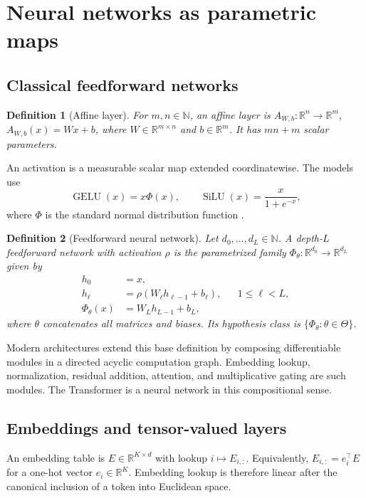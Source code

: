 \documentclass[11pt]{article}
\newtheorem{definition}{Definition}[section]
\newcommand{\N}{\mathbb N}
\newcommand{\R}{\mathbb R}
\newcommand{\1}{\mathbf 1}
\begin{document}
\section{Neural networks as parametric maps}
\label{sec:networks}

\subsection{Classical feedforward networks}

\begin{definition}[Affine layer]
For $m,n\in\N$, an affine layer is
$A_{W,b}:\R^n\to\R^m$, $A_{W,b}(x)=Wx+b$, where
$W\in\R^{m\times n}$ and $b\in\R^m$. It has $mn+m$ scalar parameters.
\end{definition}

An activation is a measurable scalar map extended coordinatewise. The models
use
\[
 \operatorname{GELU}(x)=x\Phi(x),
 \qquad
 \operatorname{SiLU}(x)=\frac{x}{1+e^{-x}},
\]
where $\Phi$ is the standard normal distribution function
\cite{hendrycks-2016-gelu,elfwing-2018-sigmoid}.

\begin{definition}[Feedforward neural network]
Let $d_0,\ldots,d_L\in\N$. A depth-$L$ feedforward network with activation
$\rho$ is the parametrized family $\Phi_\theta:\R^{d_0}\to\R^{d_L}$ given by
\begin{align*}
 h_0&=x,\\
 h_\ell&=\rho(W_\ell h_{\ell-1}+b_\ell),&&1\le\ell<L,\\
 \Phi_\theta(x)&=W_Lh_{L-1}+b_L,
\end{align*}
where $\theta$ concatenates all matrices and biases. Its hypothesis class is
$\{\Phi_\theta:\theta\in\Theta\}$.
\end{definition}

Modern architectures extend this base definition by composing differentiable
modules in a directed acyclic computation graph. Embedding lookup,
normalization, residual addition, attention, and multiplicative gating are such
modules. The Transformer is a neural network in this compositional sense.

\subsection{Embeddings and tensor-valued layers}

An embedding table is $E\in\R^{K\times d}$ with lookup $i\mapsto E_{i,:}$.
Equivalently, $E_{i,:}=e_i^\top E$ for a one-hot vector $e_i\in\R^K$.
Embedding lookup is therefore linear after the canonical inclusion of a token
into Euclidean space.
\end{document}
